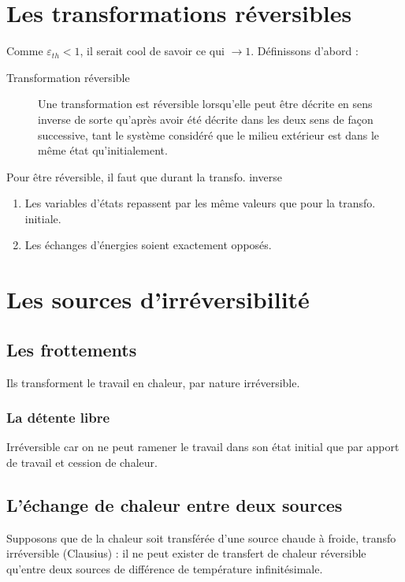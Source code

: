 	\section{Les transformations réversibles}
	Comme $\varepsilon_{th} < 1$, il serait cool de savoir ce qui 
	$\rightarrow 1$. Définissons d'abord :
	\begin{description}
	\item[Transformation réversible] Une transformation est 
	réversible lorsqu'elle peut être décrite en sens inverse de 
	sorte qu'après avoir été décrite dans les deux sens de façon 
	successive, tant le système considéré que le milieu extérieur 
	est dans le même état qu'initialement.
	\end{description}
	Pour être réversible, il faut que durant la transfo. inverse 
	\begin{enumerate}
	\item Les variables d'états repassent par les même valeurs que 
	pour la transfo. initiale.
	\item Les échanges d'énergies soient exactement opposés.
	\end{enumerate}
	
	
	\section{Les sources d'irréversibilité}
		\subsection{Les frottements}
		Ils transforment le travail en chaleur, par nature 
		irréversible.
		
		\subsubsection{La détente libre}
		Irréversible car on ne peut ramener le travail dans son 
		état initial que par apport de travail et cession de 
		chaleur.
		
		\subsection{L'échange de chaleur entre deux sources}
		Supposons que de la chaleur soit transférée d'une source 
		chaude à froide, transfo irréversible (Clausius) : il 
		ne peut exister de transfert de chaleur réversible qu'entre 
		deux sources de différence de température infinitésimale.
	
	
